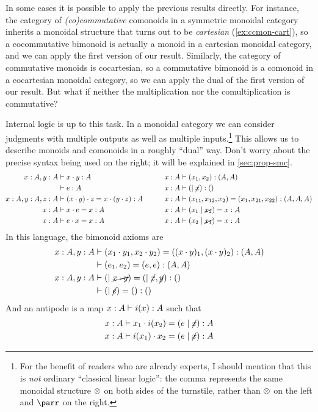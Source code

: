 In some cases it is possible to apply the previous results directly.
For instance, the category of \emph{(co)commutative} comonoids in a symmetric monoidal category inherits a monoidal structure that turns out to be \emph{cartesian} (\cref{ex:ccmon-cart}), so a cocommutative bimonoid is actually a monoid in a cartesian monoidal category, and we can apply the first version of our result.
Similarly, the category of commutative monoids is cocartesian, so a commutative bimonoid is a comonoid in a cocartesian monoidal category, so we can apply the dual of the first version of our result.
But what if neither the multiplication nor the comultiplication is commutative?

Internal logic is up to this task.
In a monoidal category we can consider judgments with multiple outputs as well as multiple inputs.\footnote{For the benefit of readers who are already experts, I should mention that this is \emph{not} ordinary ``classical linear logic'': the comma represents the same monoidal structure $\otimes$ on both sides of the turnstile, rather than $\otimes$ on the left and $\parr$ on the right.}
This allows us to describe monoids and comonoids in a roughly ``dual'' way.
Don't worry about the precise syntax being used on the right; it will be explained in \cref{sec:prop-smc}.
\begin{alignat*}{2}
  x:A, y:A &\vdash x\cdot y:A &\qquad x:A &\vdash (x_1,x_2):(A,A)\\
  &\vdash e:A &\qquad x:A &\vdash (\mid\cancel{x}):()\\
  x:A,y:A,z:A &\vdash (x\cdot y)\cdot z = x\cdot (y\cdot z) :A &\qquad x:A &\vdash (x_{11},x_{12},x_2)=(x_1,x_{21},x_{22}):(A,A,A)\\
  x:A &\vdash x\cdot e=x:A &\qquad x:A &\vdash (x_1\mid\cancel{x_2}) = x:A\\
  x:A &\vdash e\cdot x=x:A &\qquad x:A &\vdash (x_2\mid\cancel{x_1}) = x:A
\end{alignat*}
In this language, the bimonoid axioms are
\begin{align*}
  x:A,y:A &\vdash (x_1\cdot y_1,x_2\cdot y_2) = ((x\cdot y)_1,(x\cdot y)_2) :(A,A)\\
          &\vdash (e_1,e_2)=(e,e):(A,A)\\
  x:A,y:A &\vdash (\mid\cancel{x\cdot y}) = (\mid\cancel{x},\cancel{y}) : ()\\
  &\vdash (\mid\cancel{e})=():()
\end{align*}
And an antipode is a map $x:A \vdash i(x):A$ such that
\begin{align*}
  x:A &\vdash x_1\cdot i(x_2) = (e\mid\cancel{x}) :A\\
  x:A &\vdash i(x_1)\cdot x_2 = (e\mid\cancel{x}) :A
\end{align*}
